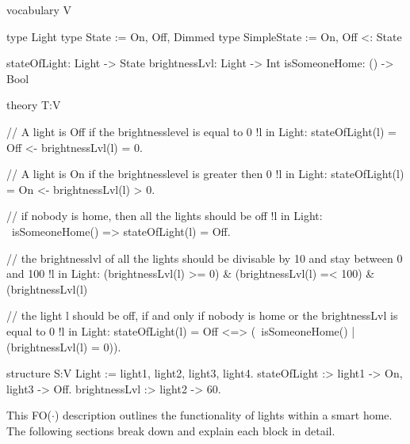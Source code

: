 \documentclass[11pt,a4paper]{report}
\newcommand{\fodot}{FO($\cdot$)\xspace}
\begin{document}
\begin{idplisting}
vocabulary V {
    type Light
    type State := {On, Off, Dimmed}
    type SimpleState := {On, Off} <: State
    
    stateOfLight: Light -> State
    brightnessLvl: Light -> Int
    isSomeoneHome: () -> Bool
}

theory T:V {
    {
       // A light is Off if the brightnesslevel is equal to 0
       !l in Light: stateOfLight(l) = Off <- brightnessLvl(l) = 0.
       
       // A light is On if the brightnesslevel is greater then 0
       !l in Light: stateOfLight(l) = On <- brightnessLvl(l) > 0.
    }
    
    // if nobody is home, then all the lights should be off
    !l in Light: ~isSomeoneHome() => stateOfLight(l) = Off.
    
    // the brightnesslvl of all the lights should be divisable by 10 and stay between 0 and 100
    !l in Light: (brightnessLvl(l) >= 0) & 
    (brightnessLvl(l) =< 100) & (brightnessLvl(l) %
    
    // the light l should be off, if and only if nobody is home or the brightnessLvl is equal to 0
    !l in Light: stateOfLight(l) = Off <=> 
    (~isSomeoneHome() | (brightnessLvl(l) = 0)).
}

structure S:V {
    Light := {light1, light2, light3, light4}.
    stateOfLight :> {light1 -> On, light3 -> Off}.
    brightnessLvl :> {light2 -> 60}.
}


\end{idplisting}
This \fodot description outlines the functionality of lights within a smart home. The following sections break down and explain each block in detail.
\end{document}
